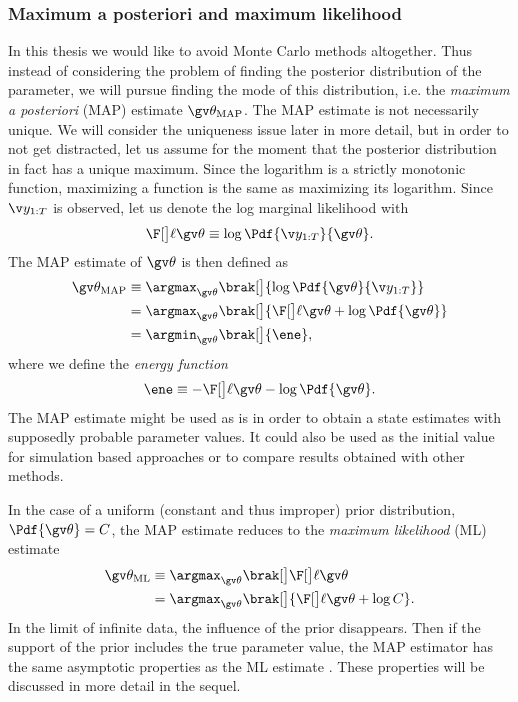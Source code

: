 \subsubsection{Maximum a posteriori and maximum likelihood}

In this thesis we would like to avoid Monte Carlo methods altogether. Thus instead
of considering the problem of finding the posterior distribution of the parameter,
we will pursue finding the mode of this distribution, i.e. the \emph{maximum a posteriori} (MAP) estimate
$\Th_{\text{MAP}}$. The MAP estimate is not necessarily unique. 
We will consider the uniqueness issue later in more detail, but in order
to not get distracted, let us assume for the moment that the posterior distribution in fact
has a unique maximum. Since the logarithm is a strictly monotonic function, maximizing a function
is the same as maximizing its logarithm. 
Since $\Y$ is observed, let us denote 
the log marginal likelihood with 
\begin{align*}
	\lLH \equiv \log \Pdf{\Y}{\Th}.
\end{align*}
The MAP estimate of $\Th$ is then defined as 
\begin{align}
	\Th_{\text{MAP}} &\equiv \argmax_{\Th}\brak[\big]{ \log\Pdf{\Th}{\Y}} \nonumber\\ 
	&=\argmax_{\Th}\brak[\big]{\lLH + \log\Pdf{\Th}} \nonumber\\
	&=\argmin_{\Th}\brak[\big]{\ene},
	\label{eq:MAP}
\end{align}
where we define the \emph{energy function} \parencite{Mbalawataa} 
\begin{align}
	\ene \equiv -\lLH - \log\Pdf{\Th}.
	\label{eq:ene}
\end{align}
The MAP estimate might be used as is in order to obtain a state estimates
with supposedly probable parameter values. It could also be used as the initial
value for simulation based approaches or to compare results obtained with other
methods.

In the case of a uniform (constant and thus improper)
prior distribution, $\Pdf{\Th}=C$, the MAP estimate reduces to the
\emph{maximum likelihood} (ML) estimate
\begin{align}
	\Th_{\text{ML}} &\equiv \argmax_{\Th}\brak[\big]\lLH\\
	&= \argmax_{\Th}\brak[\big]{\lLH+\log C} \nonumber.
	\label{eq:ML}
\end{align}
In the limit of infinite data, the influence of the prior
disappears. Then if the support of the prior includes the true
parameter value, the MAP estimator has the same asymptotic properties
as the ML estimate \parencite{Cappe2005}. These properties will be discussed in more
detail in the sequel. 

